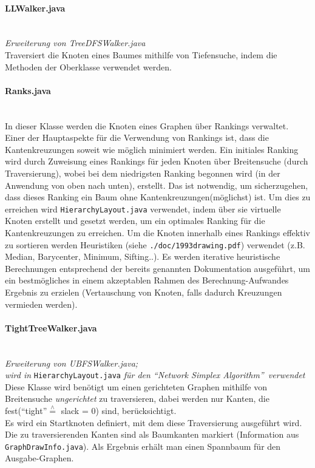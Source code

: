 \documentclass[10pt,a4paper]{article}
\begin{document}
\paragraph{LLWalker.java}\ \\
\emph{Erweiterung von TreeDFSWalker.java}\\
{\footnotesize Traversiert die Knoten eines Baumes mithilfe von Tiefensuche, indem die Methoden der Oberklasse verwendet werden.}

\paragraph{Ranks.java}\ \\
{\footnotesize In dieser Klasse werden die Knoten eines Graphen über Rankings verwaltet. Einer der Hauptaspekte für die Verwendung von Rankings ist, dass die Kantenkreuzungen soweit wie möglich minimiert werden. Ein initiales Ranking wird durch Zuweisung eines Rankings für jeden Knoten über Breitensuche (durch Traversierung), wobei bei dem niedrigsten Ranking begonnen wird (in der Anwendung von oben nach unten), erstellt. Das ist notwendig, um sicherzugehen, dass dieses Ranking ein Baum ohne Kantenkreuzungen(möglichst) ist. Um dies zu erreichen wird \texttt{HierarchyLayout.java} verwendet, indem über sie virtuelle Knoten erstellt und gesetzt werden, um ein optimales Ranking für die Kantenkreuzungen zu erreichen. Um die Knoten innerhalb eines Rankings effektiv zu sortieren werden Heuristiken (siehe \texttt{./doc/1993drawing.pdf}) verwendet (z.B. Median, Barycenter, Minimum, Sifting..). Es werden iterative heuristische Berechnungen entsprechend der bereits genannten Dokumentation ausgeführt, um ein bestmögliches in einem akzeptablen Rahmen des Berechnung-Aufwandes Ergebnis zu erzielen (Vertauschung von Knoten, falls dadurch Kreuzungen vermieden werden).}

\paragraph{TightTreeWalker.java}\ \\
\textit{Erweiterung von UBFSWalker.java;\\ wird in} {\small \texttt{HierarchyLayout.java}} \textit{für den "`Network Simplex Algorithm"'\ verwendet}\\
{\footnotesize Diese Klasse wird benötigt um einen gerichteten Graphen mithilfe von Breitensuche \textit{ungerichtet} zu traversieren, dabei werden nur Kanten, die fest("`tight"'$\overset{\wedge}{=}$ slack = 0) sind, berücksichtigt. \\
Es wird ein Startknoten definiert, mit dem diese Traversierung ausgeführt wird. Die zu traversierenden Kanten sind als Baumkanten markiert (Information aus \texttt{GraphDrawInfo.java}). Als Ergebnis erhält man einen Spannbaum für den Ausgabe-Graphen.}
\end{document}
